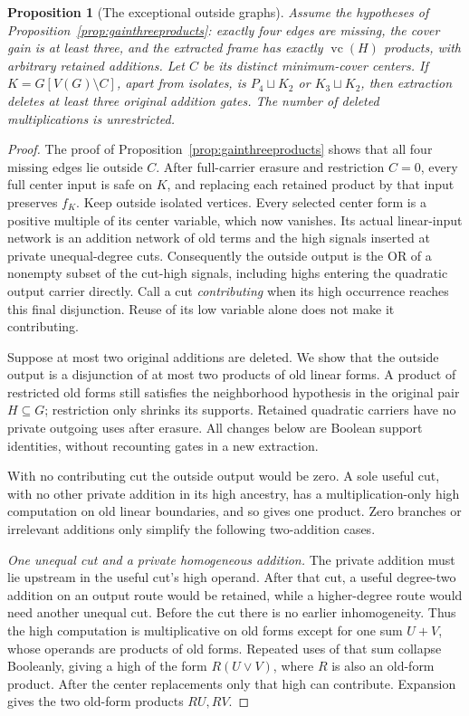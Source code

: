 \documentclass[11pt]{article}
\newcommand{\vc}{\operatorname{vc}}
\newtheorem{proposition}[theorem]{Proposition}
\theoremstyle{definition}
\theoremstyle{remark}
\begin{document}
\begin{proposition}[The exceptional outside graphs]\label{prop:exceptionaloutside}
Assume the hypotheses of Proposition~\ref{prop:gainthreeproducts}: exactly four edges are missing, the cover gain is at least three, and the extracted frame has exactly $\vc(H)$ products, with arbitrary retained additions. Let $C$ be its distinct minimum-cover centers. If $K=G[V(G)\setminus C]$, apart from isolates, is $P_4\sqcup K_2$ or $K_3\sqcup K_2$, then extraction deletes at least three original addition gates. The number of deleted multiplications is unrestricted.
\end{proposition}
\begin{proof}
The proof of Proposition~\ref{prop:gainthreeproducts} shows that all four missing edges lie outside $C$. After full-carrier erasure and restriction $C=0$, every full center input is safe on $K$, and replacing each retained product by that input preserves $f_K$. Keep outside isolated vertices. Every selected center form is a positive multiple of its center variable, which now vanishes. Its actual linear-input network is an addition network of old terms and the high signals inserted at private unequal-degree cuts. Consequently the outside output is the OR of a nonempty subset of the cut-high signals, including highs entering the quadratic output carrier directly. Call a cut \emph{contributing} when its high occurrence reaches this final disjunction. Reuse of its low variable alone does not make it contributing.

Suppose at most two original additions are deleted. We show that the outside output is a disjunction of at most two products of old linear forms. A product of restricted old forms still satisfies the neighborhood hypothesis in the original pair $H\subseteq G$; restriction only shrinks its supports. Retained quadratic carriers have no private outgoing uses after erasure. All changes below are Boolean support identities, without recounting gates in a new extraction.

With no contributing cut the outside output would be zero. A sole useful cut, with no other private addition in its high ancestry, has a multiplication-only high computation on old linear boundaries, and so gives one product. Zero branches or irrelevant additions only simplify the following two-addition cases.

\emph{One unequal cut and a private homogeneous addition.}
The private addition must lie upstream in the useful cut's high operand. After that cut, a useful degree-two addition on an output route would be retained, while a higher-degree route would need another unequal cut. Before the cut there is no earlier inhomogeneity. Thus the high computation is multiplicative on old forms except for one sum $U+V$, whose operands are products of old forms. Repeated uses of that sum collapse Booleanly, giving a high of the form $R(U\vee V)$, where $R$ is also an old-form product. After the center replacements only that high can contribute. Expansion gives the two old-form products $RU,RV$.


\end{proof}
\end{document}
